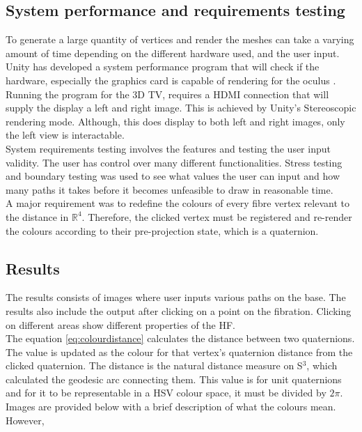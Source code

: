 \documentclass[12pt]{article} %
\begin{document}
\begin{flushleft}
\subsection{System performance and requirements testing} %
To generate a large quantity of vertices and render the meshes can take a varying amount of time depending on the different hardware used, and the user input. Unity has developed a system performance program that will check if the hardware, especially the graphics card is capable of rendering for the oculus \cite{douevenrift}. \\
Running the program for the 3D TV, requires a HDMI connection that will supply the display a left and right image. This is achieved by Unity's Stereoscopic rendering mode. Although, this does display to both left and right images, only the left view is interactable.\\
System requirements testing involves the features and testing the user input validity. The user has control over many different functionalities. Stress testing and boundary testing was used to see what values the user can input and how many paths it takes before it becomes unfeasible to draw in reasonable time.\\
A major requirement was to redefine the colours of every fibre vertex relevant to the distance in $\mathbb{R}^{4}$. Therefore, the clicked vertex must be registered and re-render the colours according to their pre-projection state, which is a quaternion.
\subsection{Results} %
The results consists of images where user inputs various paths on the base. The results also include the output after clicking on a point on the fibration. Clicking on different areas show different properties of the HF.\\
The equation \eqref{eq:colourdistance} calculates the distance between two quaternions. The value is updated as the colour for that vertex's quaternion distance from the clicked quaternion. The distance is the natural distance measure on S$^{3}$, which calculated the geodesic arc connecting them. This value is for unit quaternions and for it to be representable in a HSV colour space, it must be divided by $2\pi$. Images are provided below with a brief description of what the colours mean. However,  

\end{flushleft}
\end{document}
